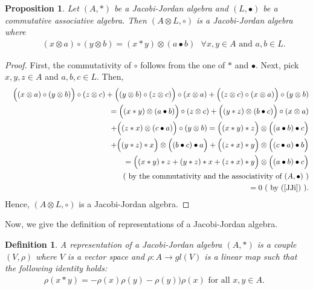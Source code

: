 \documentclass[12pt]{amsart}
\newtheorem{definition}[Theorem]{Definition}
\newtheorem{proposition}[Theorem]{Proposition}
\begin{document}
	\begin{proposition}
		Let $(A, \ast)$ be a Jacobi-Jordan algebra and $(L,\bullet)$ be a commutative associative algebra. Then  $(A\otimes L, \circ)$ is a Jacobi-Jordan algebra where
		\begin{eqnarray}
			&& (x\otimes a)\circ(y\otimes b)=(x\ast y)\otimes(a\bullet b)  \mbox{  $\forall x,y\in A$ and $a,b\in L. $}\nonumber
		\end{eqnarray}
	\end{proposition}
	\begin{proof}
		First, the commutativity of $\circ$ follows from the one of $\ast$ and $\bullet$. Next, pick $x,y,z\in A$ and $a,b,c\in L.$ Then,
		\begin{eqnarray}
			&& \Big((x\otimes a)\circ(y\otimes b) \Big)\circ (z\otimes c)+
			\Big((y\otimes b)\circ(z\otimes c) \Big)\circ (x\otimes a)+
			\Big((z\otimes c)\circ(x\otimes a) \Big)\circ (y\otimes b)\nonumber\\
			&&=\Big((x\ast y)\otimes(a\bullet b) \Big)\circ (z\otimes c)+
			\Big((y\ast z)\otimes(b\bullet c) \Big)\circ (x\otimes a)\nonumber\\
			&&+
			\Big((z\ast x)\otimes(c\bullet a) \Big)\circ (y\otimes b)
			=\Big((x\ast y)\ast z\Big)\otimes\Big((a\bullet b)\bullet c\Big)\nonumber\\
			&&+
			\Big((y\ast z)\ast x\Big)\otimes\Big((b\bullet c)\bullet a\Big)
			+\Big((z\ast x)\ast y\Big)\otimes\Big((c\bullet a)\bullet b\Big)\nonumber\\
			&&=\Big((x\ast y)\ast z+(y\ast z)\ast x+(z\ast x)\ast y\Big)\otimes\Big((a\bullet b)\bullet c\Big)\nonumber\\
			&& \mbox{  ( by the commutativity  and the associativity of $(A,\bullet)$ )}\nonumber\\
			&&=0 \mbox{ ( by (\ref{JJi}) ).}\nonumber
		\end{eqnarray}
		Hence, $(A\otimes L, \circ)$ is a Jacobi-Jordan algebra.
	\end{proof}
	Now, we give the definition of representations of a Jacobi-Jordan algebra.
	\begin{definition}\cite{pzu}
		A representation of a Jacobi-Jordan algebra $(A, \ast)$  is a couple $(V,\rho)$ where $V$ is a vector space and $\rho: A\rightarrow gl(V)$ is a linear map
		such that the following identity holds:
		\begin{eqnarray}
			\rho(x\ast y)=-\rho(x)\rho(y)-\rho(y))\rho(x) \mbox{  for all $x,y\in A.$ }\label{rHJJ2}
		\end{eqnarray}
	\end{definition}
\end{document}
